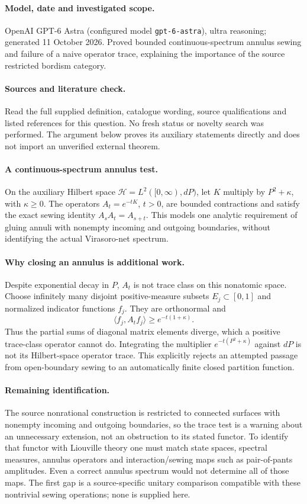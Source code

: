 \documentclass[11pt]{article}
\begin{document}
\paragraph{Model, date and investigated scope.}
OpenAI GPT-6 Astra (configured model \texttt{gpt-6-astra}), ultra reasoning; generated 11 October 2026. Proved bounded continuous-spectrum annulus sewing and failure of a naive operator trace, explaining the importance of the source restricted bordism category.

\paragraph{Sources and literature check.}
Read the full supplied definition, catalogue wording, source qualifications and listed references for this question. No fresh status or novelty search was performed. The argument below proves its auxiliary statements directly and does not import an unverified external theorem.

\paragraph{A continuous-spectrum annulus test.} On the auxiliary Hilbert space \(\mathcal H=L^2([0,\infty),dP)\), let \(K\) multiply by \(P^2+\kappa\), with \(\kappa\geq0\). The operators \(A_t=e^{-tK}\), \(t>0\), are bounded contractions and satisfy the exact sewing identity \(A_sA_t=A_{s+t}\). This models one analytic requirement of gluing annuli with nonempty incoming and outgoing boundaries, without identifying the actual Virasoro-net spectrum.
\paragraph{Why closing an annulus is additional work.} Despite exponential decay in \(P\), \(A_t\) is not trace class on this nonatomic space. Choose infinitely many disjoint positive-measure subsets \(E_j\subset[0,1]\) and normalized indicator functions \(f_j\). They are orthonormal and
\[
 \langle f_j,A_tf_j\rangle\geq e^{-t(1+\kappa)}.
\]
Thus the partial sums of diagonal matrix elements diverge, which a positive trace-class operator cannot do. Integrating the multiplier \(e^{-t(P^2+\kappa)}\) against \(dP\) is not its Hilbert-space operator trace. This explicitly rejects an attempted passage from open-boundary sewing to an automatically finite closed partition function.
\paragraph{Remaining identification.} The source nonrational construction is restricted to connected surfaces with nonempty incoming and outgoing boundaries, so the trace test is a warning about an unnecessary extension, not an obstruction to its stated functor. To identify that functor with Liouville theory one must match state spaces, spectral measures, annulus operators and interaction/sewing maps such as pair-of-pants amplitudes. Even a correct annulus spectrum would not determine all of those maps. The first gap is a source-specific unitary comparison compatible with these nontrivial sewing operations; none is supplied here.
\end{document}
